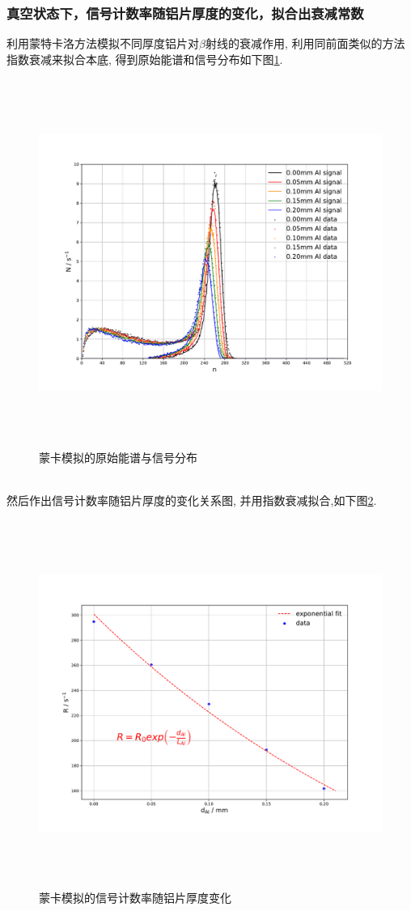 \documentclass[a4paper]{article}
\begin{document}
\subsubsection{真空状态下，信号计数率随铝片厚度的变化，拟合出衰减常数}
利用蒙特卡洛方法模拟不同厚度铝片对$\beta$射线的衰减作用, 利用同前面类似的方法指数衰减来拟合本底, 得到原始能谱和信号分布如下图\ref{fig:fig7}. 
\begin{figure}[ht]
 \centering
 \includegraphics[height=12cm, width=16cm]{images/phyex2_fig1.pdf}
 \caption{蒙卡模拟的原始能谱与信号分布}
 \label{fig:fig7}
\end{figure}\\
\newpage
然后作出信号计数率随铝片厚度的变化关系图, 并用指数衰减拟合,如下图\ref{fig:fig8}. 
\begin{figure}[ht]
 \centering
 \includegraphics[height=12cm, width=16cm]{images/phyex2_fig2.pdf}
 \caption{蒙卡模拟的信号计数率随铝片厚度变化}
 \label{fig:fig8}
\end{figure}\\\\
\end{document}
